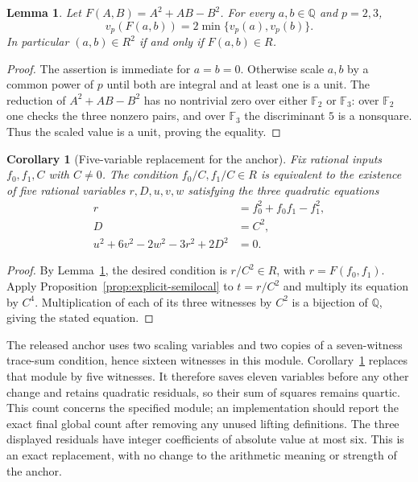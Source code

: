\documentclass[11pt]{article}
\newtheorem{lemma}{Lemma}
\newtheorem{corollary}{Corollary}
\begin{document}
\begin{lemma}\label{lem:two-semilocal-inputs}
Let $F(A,B)=A^2+AB-B^2$. For every $a,b\in\mathbb Q$ and $p=2,3$,
\[
 v_p(F(a,b))=2\min\{v_p(a),v_p(b)\}.
\]
In particular $(a,b)\in R^2$ if and only if $F(a,b)\in R$.
\end{lemma}
\begin{proof}
The assertion is immediate for $a=b=0$. Otherwise scale $a,b$ by a
common power of $p$ until both are integral and at least one is a unit.
The reduction of $A^2+AB-B^2$ has no nontrivial zero over either
$\mathbb F_2$ or $\mathbb F_3$: over $\mathbb F_2$ one checks the
three nonzero pairs, and over $\mathbb F_3$ the discriminant $5$
is a nonsquare. Thus the scaled value is a unit, proving the equality.
\end{proof}

\begin{corollary}[Five-variable replacement for the anchor]
\label{cor:five-anchor}
Fix rational inputs $f_0,f_1,C$ with $C\ne0$. The condition
$f_0/C,f_1/C\in R$ is equivalent to the existence of five rational
variables $r,D,u,v,w$ satisfying the three quadratic equations
\begin{align*}
 r&=f_0^2+f_0f_1-f_1^2,\\
 D&=C^2,\\
 u^2+6v^2-2w^2-3r^2+2D^2&=0.
\end{align*}
\end{corollary}
\begin{proof}
By Lemma~\ref{lem:two-semilocal-inputs}, the desired condition is
$r/C^2\in R$, with $r=F(f_0,f_1)$. Apply
Proposition~\ref{prop:explicit-semilocal} to $t=r/C^2$ and multiply
its equation by $C^4$. Multiplication of each of its three witnesses
by $C^2$ is a bijection of $\mathbb Q$, giving the stated equation.
\end{proof}

The released anchor uses two scaling variables and two copies of a
seven-witness trace-sum condition, hence sixteen witnesses in this module.
Corollary~\ref{cor:five-anchor} replaces that module by five witnesses.
It therefore saves eleven variables before any other change and retains
quadratic residuals, so their sum of squares remains quartic. This count
concerns the specified module; an implementation should report the exact
final global count after removing any unused lifting definitions.
The three displayed residuals have integer coefficients of absolute value
at most six. This is an exact replacement, with no change to the arithmetic
meaning or strength of the anchor.
\end{document}
